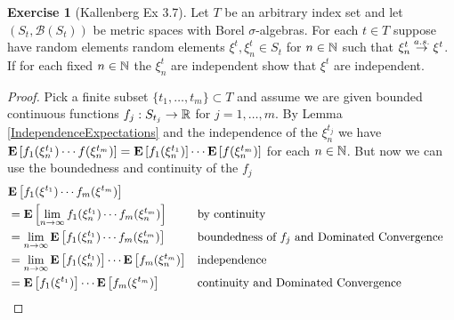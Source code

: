 \documentclass{amsart}
\theoremstyle{remark}
\theoremstyle{definition}
\newtheorem{ex}[thm]{Exercise}
\begin{document}
\begin{ex}[Kallenberg Ex 3.7]Let $T$ be an arbitrary index set and let
  $(S_t, \mathcal{B}(S_t))$ be metric spaces with Borel
  $\sigma$-algebras.  For each $t\in T$ suppose have random elements
  random elements $\xi^t, \xi^t_n \in S_t$  for $n \in \mathbb{N}$ such
  that $\xi^t_n \overset{a.s.}\to \xi^t$.  If for each fixed $n \in \mathbb{N}$ the
  $\xi^t_n$ are independent show that $\xi^t$ are independent.
\end{ex}
\begin{proof}
Pick a finite subset $\lbrace t_1, \dotsc, t_m \rbrace \subset T$ and
assume we are given bounded continuous functions $f_j : S_{t_j} \to
\mathbb{R}$ for $j=1, \dotsc, m$.
By Lemma \ref{IndependenceExpectations} and the independence of the
$\xi^{t_j}_n$ we have $\textbf{E}\left[f_1(\xi^{t_1}_n) \dotsm
  f(\xi^{t_m}_n)\right] = \textbf{E}\left[f_1(\xi^{t_1}_n)\right]\dotsm
 \textbf{E}\left[ f(\xi^{t_m}_n)\right]$ for each $n \in \mathbb{N}$.  But now
 we can use the boundedness and continuity of the $f_j$ 
\begin{align*}
&\textbf{E}\left[f_1(\xi^{t_1}) \dotsm f_m(\xi^{t_m})\right] \\
&=
\textbf{E}\left[\lim_{n \to \infty} f_1(\xi_n^{t_1}) \dotsm
  f_m(\xi_n^{t_m})\right] & & \text{by continuity} \\
&= \lim_{n \to \infty} \textbf{E}\left[f_1(\xi_n^{t_1}) \dotsm
  f_m(\xi_n^{t_m})\right] & & \text{boundedness of $f_j$ and Dominated
  Convergence}  \\
&= \lim_{n \to \infty} \textbf{E}\left[f_1(\xi_n^{t_1})\right] \dotsm
 \textbf{E}\left[ f_m(\xi_n^{t_m})\right] & & \text{independence}  \\
&= \textbf{E}\left[f_1(\xi^{t_1})\right] \dotsm
 \textbf{E}\left[ f_m(\xi^{t_m})\right] & &
 \text{continuity and Dominated Convergence} \\
\end{align*}


\end{proof}
\end{document}
